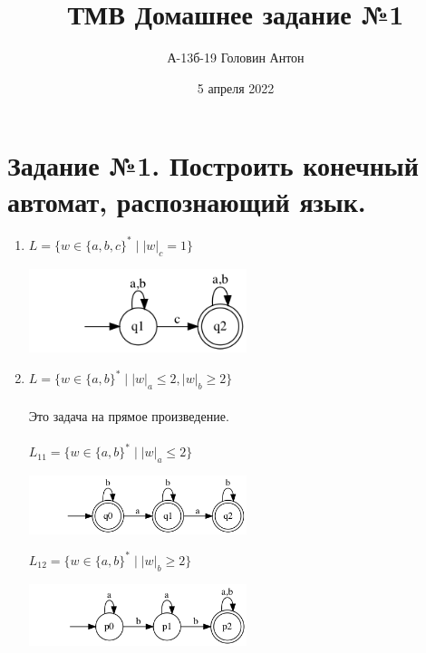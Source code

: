 \documentclass{article}
\title{ТМВ Домашнее задание №1}
\author{А-13б-19 Головин Антон}
\date{5 апреля 2022}
\begin{document}
\maketitle

\section{Задание №1. Построить конечный автомат, распознающий язык.}
\begin{enumerate}
\\
\item {$L = \{ w \in \{a,b,c\}^* \mid |w|_c = 1 \} $} \\
    \begin{center}
        \includegraphics[width=0.5\textwidth]{g11.png}
    \end{center}

\item {$L = \{ w \in \{a,b\}^*  \mid  |w|_a \le 2, {|w|_b} \ge 2 \}$} \\ \\
    Это задача на прямое произведение. \\ \\
    $L_{11} = \{ w \in \{a,b\}^*  \mid  |w|_a \le 2 \} $\\
    \begin{center}
        \includegraphics[width=0.5\textwidth]{g121.png}
    \end{center}

    $L_{12} = \{ w \in \{a,b\}^*  \mid  |w|_b \ge 2 \} $
    \begin{center}
        \includegraphics[width=0.5\textwidth]{g122.png}
    \end{center}
    

\end{enumerate}
\end{document}
